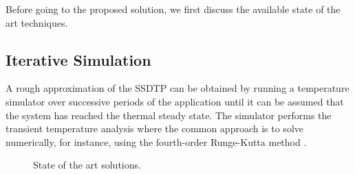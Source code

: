 Before going to the proposed solution, we first discuss the available state of the art techniques.

\subsection{Iterative Simulation} \label{sec:hotspot-iterative-solution}
A rough approximation of the SSDTP can be obtained by running a temperature simulator over successive periods of the application until it can be assumed that the system has reached the thermal steady state. The simulator performs the transient temperature analysis where the common approach is to solve  numerically, for instance, using the fourth-order Runge-Kutta method \cite{press2007}.

\begin{figure}[t]
  \centering
  \caption{State of the art solutions.}
\end{figure}

